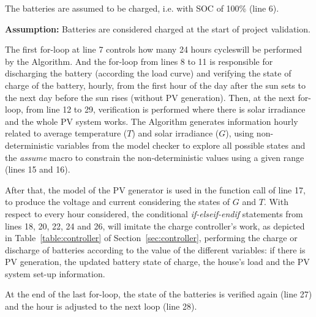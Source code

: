 The batteries are assumed to be charged, i.e. with SOC of 100\% (line 6).

\textbf{Assumption:} Batteries are considered charged at the start of project validation.

The first for-loop at line 7 controls how many 24 hours cycleswill be performed by the Algorithm.  And the for-loop from lines 8 to 11 is responsible for discharging the battery (according the load curve) and verifying the state of charge of the battery, hourly, from the first hour of the day after the sun sets to the next day before the sun rises (without PV generation). Then, at the next for-loop, from line 12 to 29, verification is performed where there is solar irradiance and the whole PV system works. The Algorithm generates information hourly related to average temperature ($T$) and solar irradiance ($G$), using non-deterministic variables from the model checker to explore all possible states and the \textit{assume} macro to constrain the non-deterministic values using a given range (lines 15 and 16). 

After that, the model of the PV generator is used in the function call of line 17, to produce the voltage and current considering the states of $G$ and $T$. With respect to every hour considered, the conditional \textit{if-elseif-endif} statements from lines 18, 20, 22, 24 and 26, will imitate the charge controller's work, as depicted in Table~\ref{table:controller} of Section~\ref{sec:controller}, performing the charge or discharge of batteries according to the value of the different variables: if there is PV generation, the updated battery state of charge, the house's load and the PV system set-up information.

At the end of the last for-loop, the state of the batteries is verified again (line 27) and the hour is adjusted to the next loop (line 28).

